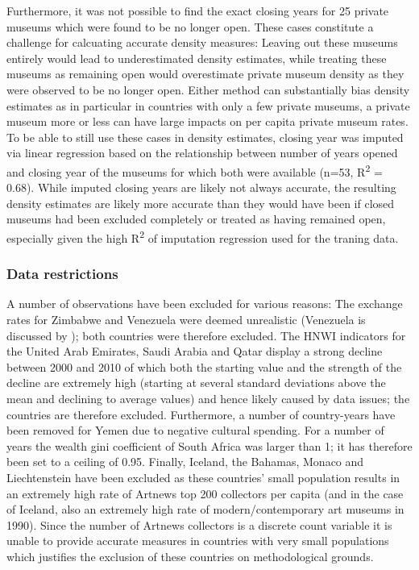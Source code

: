 \documentclass[11pt]{article}
\begin{document}
Furthermore, it was not possible to find the exact closing years for 25 private museums which were found to be no longer open.
These cases constitute a challenge for calcuating accurate density measures: 
Leaving out these museums entirely would lead to underestimated density estimates, while treating these museums as remaining open would overestimate private museum density as they were observed to be no longer open. 
Either method can substantially bias density estimates as in particular in countries with only a few private museums, a private museum more or less can have large impacts on per capita private museum rates.
To be able to still use these cases in density estimates, closing year was imputed via linear regression based on the relationship between number of years opened and closing year of the museums for which both were available (n=53, R\textsuperscript{2} = 0.68).
While imputed closing years are likely not always accurate, the resulting density estimates are likely more accurate than they would have been if closed museums had been excluded completely or treated as having remained open, especially given the high R\textsuperscript{2} of imputation regression used for the traning data.


\subsubsection{Data restrictions}

A number of observations have been excluded for various reasons:
The exchange rates for Zimbabwe and Venezuela were deemed unrealistic (Venezuela is discussed by \textcite{Blanchet_2017_conversions}); both countries were therefore excluded.
The HNWI indicators for the United Arab Emirates, Saudi Arabia and Qatar display a strong decline between 2000 and 2010 of which both the starting value and the strength of the decline are extremely high (starting at several standard deviations above the mean and declining to average values) and hence likely caused by data issues; the countries are therefore excluded. 
Furthermore, a number of country-years have been removed for Yemen due to negative cultural spending.
For a number of years the wealth gini coefficient of South Africa was larger than 1; it has therefore been set to a ceiling of 0.95.
Finally, Iceland, the Bahamas, Monaco and Liechtenstein have been excluded as these countries' small population results in an extremely high rate of Artnews top 200 collectors per capita (and in the case of Iceland, also an extremely high rate of modern/contemporary art museums in 1990).
Since the number of Artnews collectors is a discrete count variable it is unable to provide accurate measures in countries with very small populations which justifies the exclusion of these countries on methodological grounds.
\end{document}
